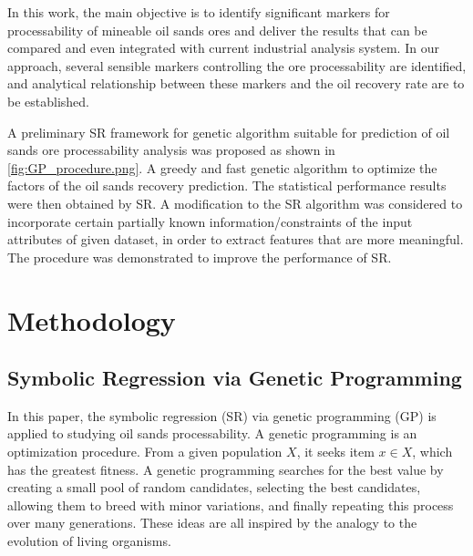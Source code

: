 \documentclass[10pt,journal,compsoc]{IEEEtran}
\begin{document}
In this work, the main objective is to identify significant markers for processability of mineable oil sands ores and deliver the results that can be compared and even integrated with current industrial analysis system. In our approach, several sensible markers controlling the ore processability are identified, and analytical relationship between these markers and the oil recovery rate are to be established.

A preliminary SR  framework for genetic algorithm suitable for prediction of oil sands ore processability analysis was proposed as shown in \autoref{fig:GP_procedure.png}. A greedy and fast genetic algorithm to optimize the factors of the oil sands recovery prediction. The statistical performance results were then obtained by SR. A modification to the SR algorithm was considered to incorporate certain partially known information/constraints of the input attributes of given dataset, in order to extract features that are more meaningful. The procedure was demonstrated to improve the performance of SR.


 
\section{Methodology}

\subsection{Symbolic Regression via Genetic Programming}  


In this paper, the symbolic regression (SR) via genetic programming (GP) is applied to studying oil sands processability. 
A genetic programming is an optimization procedure. From a given population $X$, it seeks item $x \in X$, which has the greatest fitness. A genetic programming searches for the best value by creating a small pool of random candidates, selecting the best candidates, allowing them to breed with minor variations, and finally repeating this process over many generations. These ideas are all inspired by the analogy to the evolution of living organisms\cite{MichalewiczGP}.
\end{document}
